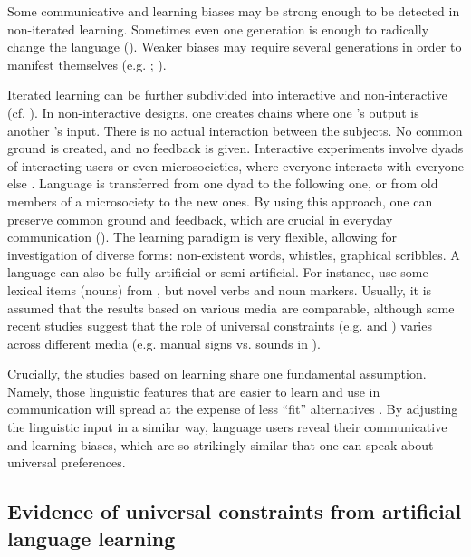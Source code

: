 \documentclass[output=paper]{langsci/langscibook}
\begin{document}
Some communicative and learning biases may be strong enough to be detected in non-iterated learning. Sometimes even one generation is enough to radically change the language (\citealt{Hudson2009_ChangeLearn}). Weaker biases may require several generations in order to manifest themselves (e.g. \citealt{RealiGriffiths2009}; \citealt{SmithWonnacott2010}). 

Iterated learning can be further subdivided into interactive and non-interactive (cf. \citealt{Tamariz2017}). In non-interactive designs, one creates  chains where one ’s output is another ’s input. There is no actual interaction between the subjects. No common ground is created, and no feedback is given. Interactive experiments involve dyads of interacting users or even microsocieties, where everyone interacts with everyone else \citep{Tamariz2017}. Language is transferred from one dyad to the following one, or from old members of a microsociety to the new ones. By using this approach, one can preserve common ground and feedback, which are crucial in everyday communication (\citealt{CaldwellSmith2012}). 
\newpage
The  learning paradigm is very flexible, allowing for investigation of diverse forms: non-existent words, whistles, graphical scribbles. A language can also be fully artificial or semi-artificial. For instance, \citet{SmithWonnacott2010} use some lexical items (nouns) from , but novel verbs and  noun markers. Usually, it is assumed that the results based on various media are comparable, although some recent studies suggest that the role of universal constraints (e.g.  and ) varies across different media (e.g. manual signs vs. sounds in \citealt{LittleEtAl2017}).

Crucially, the studies based on  learning share one fundamental assumption. Namely, those linguistic features that are easier to learn and use in communication will spread at the expense of less “fit” alternatives \citep{SmithEtAl2017}. By adjusting the linguistic input in a similar way, language users reveal their communicative and learning biases, which are so strikingly similar that one can speak about universal preferences. 

\subsection{Evidence of universal constraints from artificial language learning}
\end{document}
